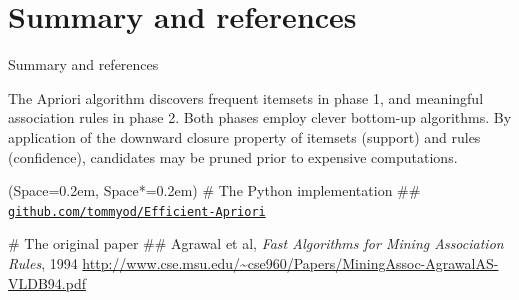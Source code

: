 \documentclass[12pt, aspectratio=1610]{beamer}
\newcommand{\listSpace}{0.2em}
\theoremstyle{plain}
\begin{document}
\section{Summary and references}
\begin{frame}[fragile]{Summary and references}
	
	The Apriori algorithm discovers frequent itemsets in phase 1, and meaningful association rules in phase 2.
	Both phases employ clever bottom-up algorithms.
	By application of the downward closure property of itemsets (support) and rules (confidence), candidates may be pruned prior to expensive computations.
	
	\vfill
	
	\begin{easylist}[itemize]
		\ListProperties(Space=\listSpace, Space*=\listSpace)
		# The Python implementation ##
		 \href{https://github.com/tommyod/Efficient-Apriori/}{\texttt{github.com/tommyod/Efficient-Apriori}}
		
		# The original paper
		## Agrawal et al, \emph{Fast Algorithms for Mining Association Rules}, 1994  \url{http://www.cse.msu.edu/~cse960/Papers/MiningAssoc-AgrawalAS-VLDB94.pdf}
		
	\end{easylist}
\end{frame}
\end{document}
